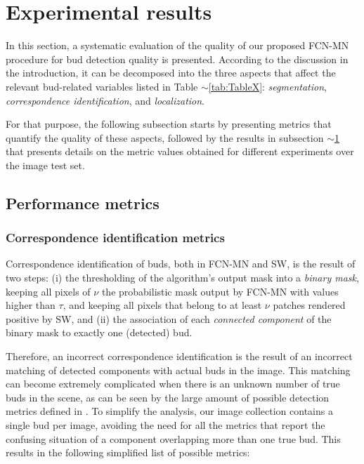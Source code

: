 \documentclass[a4paper,authoryear,review]{elsarticle}
\begin{document}
\section{Experimental results} 
\label{sec:results}

In this section, a systematic evaluation of the quality of our proposed FCN-MN procedure for bud detection quality is presented. According to the discussion in the introduction, it can be decomposed into the three aspects that affect the relevant bud-related variables listed in Table $\sim$\ref{tab:TableX}: \emph{segmentation}, \emph{correspondence identification}, and \emph{localization}. 

For that purpose, the following subsection starts by presenting metrics that quantify the quality of these aspects, followed by the results in subsection $\sim$\ref{sec:results} that presents details on the metric values obtained for different experiments over the image test set. 

\subsection{Performance metrics}
\label{sec:metrics}

\subsubsection{Correspondence identification metrics}
\label{subsec:detectmetrics}

Correspondence identification of buds, both in  FCN-MN and SW, is the result of two steps: (i)  the thresholding of the algorithm’s output mask into a \emph{binary mask}, keeping all pixels of $\nu$ the probabilistic mask output by FCN-MN with values higher than $\tau$, and keeping all pixels that belong to at least $\nu$ patches rendered positive by SW, and (ii) the association of each \emph{connected component} of the binary mask to exactly one (detected) bud. 

Therefore, an incorrect correspondence identification is the result of an incorrect matching of detected components with actual buds in the image. This matching can become extremely complicated when there is an unknown number of true buds in the scene, as can be seen by the large amount of possible detection metrics defined in \citet{oguz2017dice}. To simplify the analysis, our image collection contains a single bud per image, avoiding the need for all the metrics that report the confusing situation of a component overlapping more than one true bud. This results in the following simplified list of possible metrics:
\end{document}
